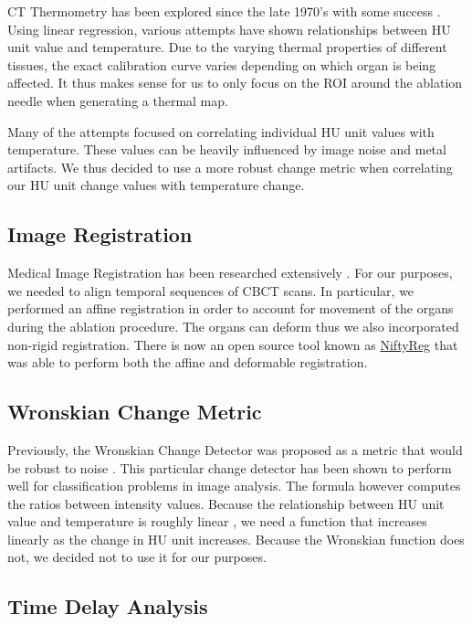 \documentclass[]{spie}  %
\begin{document}
CT Thermometry has been explored since the late 1970's with some success \cite{Fani14}. Using linear regression, various attempts have shown relationships between HU unit value and temperature. Due to the varying thermal properties of different tissues, the exact calibration curve varies depending on which organ is being affected. It thus makes sense for us to only focus on the ROI around the ablation needle when generating a thermal map. 

Many of the attempts focused on correlating individual HU unit values with temperature. These values can be heavily influenced by image noise and metal artifacts. We thus decided to use a more robust change metric when correlating our HU unit change values with temperature change.  

\subsection{Image Registration}

Medical Image Registration has been researched extensively \cite{Oliveira14, Hill01}. For our purposes, we needed to align temporal sequences of CBCT scans. In particular, we performed an affine registration in order to account for movement of the organs during the ablation procedure. The organs can deform thus we also incorporated non-rigid registration. There is now an open source tool known as \href{http://cmictig.cs.ucl.ac.uk/wiki/index.php/NiftyReg}{NiftyReg} \cite{Ourselin01,Modat10} that was able to perform both the affine \cite{Ourselin01} and deformable \cite{Modat10} registration.   

\subsection{Wronskian Change Metric}

Previously, the Wronskian Change Detector \cite{Durucan01} was proposed as a metric that would be robust to noise \cite{Li13}. This particular change detector has been shown to perform well for classification problems \cite{Panda13,Durucan01,Ang11,Subudhi13} in image analysis. The formula however computes the ratios between intensity values. Because the relationship between HU unit value and temperature is roughly linear \cite{Fani14}, we need a function that increases linearly as the change in HU unit increases. Because the Wronskian function does not, we decided not to use it for our purposes. 

\subsection{Time Delay Analysis}
\end{document}
